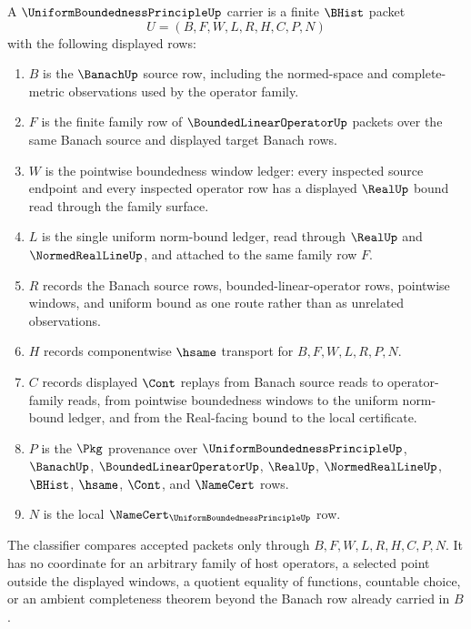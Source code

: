 \begin{definition}
\label{def:uniform-boundedness-principle-carrier}
A $\UniformBoundednessPrincipleUp$ carrier is a finite $\BHist$ packet
$$
U=(B,F,W,L,R,H,C,P,N)
$$
with the following displayed rows:
\begin{enumerate}
\item $B$ is the $\BanachUp$ source row, including the normed-space and complete-metric observations used by the operator family.
\item $F$ is the finite family row of $\BoundedLinearOperatorUp$ packets over the same Banach source and displayed target Banach rows.
\item $W$ is the pointwise boundedness window ledger: every inspected source endpoint and every inspected operator row has a displayed $\RealUp$ bound read through the family surface.
\item $L$ is the single uniform norm-bound ledger, read through $\RealUp$ and $\NormedRealLineUp$, and attached to the same family row $F$.
\item $R$ records the Banach source rows, bounded-linear-operator rows, pointwise windows, and uniform bound as one route rather than as unrelated observations.
\item $H$ records componentwise $\hsame$ transport for $B,F,W,L,R,P,N$.
\item $C$ records displayed $\Cont$ replays from Banach source reads to operator-family reads, from pointwise boundedness windows to the uniform norm-bound ledger, and from the Real-facing bound to the local certificate.
\item $P$ is the $\Pkg$ provenance over $\UniformBoundednessPrincipleUp$, $\BanachUp$, $\BoundedLinearOperatorUp$, $\RealUp$, $\NormedRealLineUp$, $\BHist$, $\hsame$, $\Cont$, and $\NameCert$ rows.
\item $N$ is the local $\NameCert_{\UniformBoundednessPrincipleUp}$ row.
\end{enumerate}
The classifier compares accepted packets only through $B,F,W,L,R,H,C,P,N$. It has no coordinate for an arbitrary family of host operators, a selected point outside the displayed windows, a quotient equality of functions, countable choice, or an ambient completeness theorem beyond the Banach row already carried in $B$.
\end{definition}

